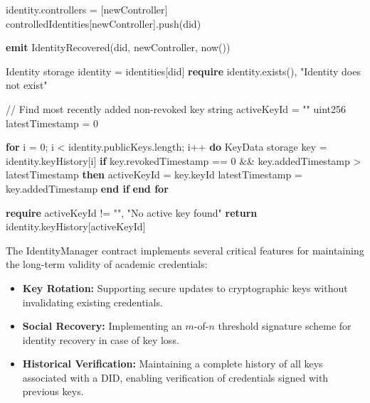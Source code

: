 \documentclass[lettersize,journal]{IEEEtran}
\begin{document}
\begin{itemize}
\begin{algorithm}[H]
\begin{algorithmic}[1]
    \State identity.controllers = [newController]
    \State controlledIdentities[newController].push(did)
    
    \State \textbf{emit} IdentityRecovered(did, newController, now())
\EndFunction
\Statex 

    \State Identity storage identity = identities[did]
    \State \textbf{require} identity.exists(), "Identity does not exist"
    
    \State // Find most recently added non-revoked key
    \State string activeKeyId = ""
    \State uint256 latestTimestamp = 0
    
    \State \textbf{for} i = 0; i < identity.publicKeys.length; i++ \textbf{do}
        \State \hspace{\algorithmicindent} KeyData storage key = identity.keyHistory[i]
        \State \hspace{\algorithmicindent} \textbf{if} key.revokedTimestamp == 0 && key.addedTimestamp > latestTimestamp \textbf{then}
            \State \hspace{\algorithmicindent}\hspace{\algorithmicindent} activeKeyId = key.keyId
            \State \hspace{\algorithmicindent}\hspace{\algorithmicindent} latestTimestamp = key.addedTimestamp
        \State \hspace{\algorithmicindent} \textbf{end if}
    \State \textbf{end for}
    
    \State \textbf{require} activeKeyId != "", "No active key found"
    \State \textbf{return} identity.keyHistory[activeKeyId]
\EndFunction
\end{algorithmic}
\end{algorithm}

The IdentityManager contract implements several critical features for maintaining the long-term validity of academic credentials:

\begin{itemize}
    \item \textbf{Key Rotation:} Supporting secure updates to cryptographic keys without invalidating existing credentials.
    
    \item \textbf{Social Recovery:} Implementing an $m$-of-$n$ threshold signature scheme for identity recovery in case of key loss.
    
    \item \textbf{Historical Verification:} Maintaining a complete history of all keys associated with a DID, enabling verification of credentials signed with previous keys.
    

\end{itemize}
\end{itemize}
\end{document}
